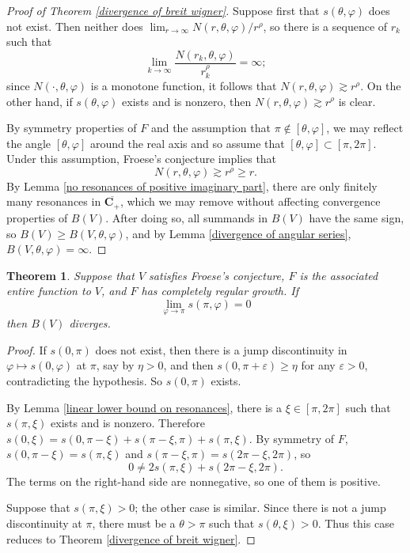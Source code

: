 \documentclass[12pt]{report}
\newcommand{\CC}{\mathbf{C}}
\newtheorem{theorem}{Theorem}[chapter]
\theoremstyle{definition}
\begin{document}
\begin{proof}[Proof of Theorem \ref{divergence of breit wigner}]
Suppose first that $s(\theta, \varphi)$ does not exist. Then neither does $\lim_{r \to \infty} N(r, \theta, \varphi)/r^\rho$, so there is a sequence of $r_k$ such that
$$\lim_{k \to \infty} \frac{N(r_k, \theta, \varphi)}{r_k^\rho} = \infty;$$
since $N(\cdot, \theta, \varphi)$ is a monotone function, it follows that $N(r, \theta, \varphi) \gtrsim r^\rho$.
On the other hand, if $s(\theta, \varphi)$ exists and is nonzero, then $N(r, \theta, \varphi) \gtrsim r^\rho$ is clear.

By symmetry properties of $F$ and the assumption that $\pi \notin [\theta, \varphi]$, we may reflect the angle $[\theta, \varphi]$ around the real axis and so assume that $[\theta, \varphi] \subset [\pi, 2\pi]$.
Under this assumption, Froese's conjecture implies that
$$N(r, \theta, \varphi) \gtrsim r^\rho \geq r.$$
By Lemma \ref{no resonances of positive imaginary part}, there are only finitely many resonances in $\overline{\CC_+}$, which we may remove without affecting convergence properties of $B(V)$.
After doing so, all summands in $B(V)$ have the same sign, so $B(V) \geq B(V, \theta, \varphi)$, and by Lemma \ref{divergence of angular series}, $B(V, \theta, \varphi) = \infty$.
\end{proof}

\begin{theorem}
\label{third case of divergence}
Suppose that $V$ satisfies Froese's conjecture, $F$ is the associated entire function to $V$, and $F$ has completely regular growth.
If
$$\lim_{\varphi \to \pi} s(\pi, \varphi) = 0$$
then $B(V)$ diverges.
\end{theorem}
\begin{proof}
If $s(0, \pi)$ does not exist, then there is a jump discontinuity in $\varphi \mapsto s(0, \varphi)$ at $\pi$, say by $\eta > 0$, and then $s(0, \pi + \varepsilon) \geq \eta$ for any $\varepsilon > 0$, contradicting the hypothesis. So $s(0, \pi)$ exists.

By Lemma \ref{linear lower bound on resonances}, there is a $\xi \in [\pi, 2\pi]$ such that $s(\pi, \xi)$ exists and is nonzero.
Therefore $s(0, \xi) = s(0, \pi - \xi) + s(\pi - \xi, \pi) + s(\pi, \xi)$.
By symmetry of $F$, $s(0, \pi - \xi) = s(\pi, \xi)$ and $s(\pi - \xi, \pi) = s(2\pi - \xi, 2\pi)$, so
$$0 \neq 2s(\pi, \xi) + s(2\pi - \xi, 2\pi).$$
The terms on the right-hand side are nonnegative, so one of them is positive.

Suppose that $s(\pi, \xi) > 0$; the other case is similar. Since there is not a jump discontinuity at $\pi$, there must be a $\theta > \pi$ such that $s(\theta, \xi) > 0$. Thus this case reduces to Theorem \ref{divergence of breit wigner}.
\end{proof}




\printbibliography



\printindex
\end{document}
